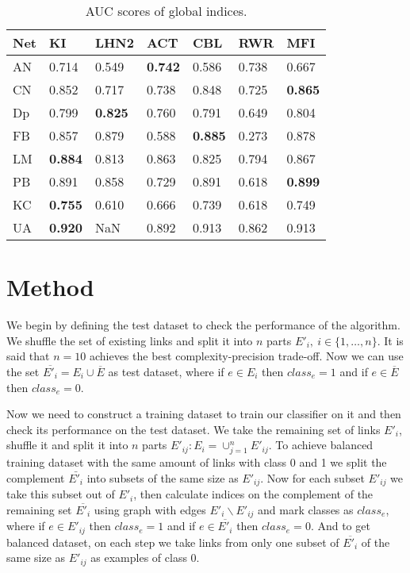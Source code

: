 \documentclass{llncs}
\begin{document}
\begin{table}
\begin{center}
\caption{AUC scores of global indices.}
\begin{tabular}{| l | l | l | l | l | l | l |}
\hline
Net & KI & LHN2 & ACT & CBL & RWR & MFI \\ \hline
AN & 0.714 & 0.549 & \textbf{0.742} & 0.586 & 0.738 & 0.667 \\ \hline
CN & 0.852 & 0.717 & 0.738 & 0.848 & 0.725 & \textbf{0.865} \\ \hline
Dp & 0.799 & \textbf{0.825} & 0.760 & 0.791 & 0.649 & 0.804 \\ \hline
FB & 0.857 & 0.879 & 0.588 & \textbf{0.885} & 0.273 & 0.878 \\ \hline
LM & \textbf{0.884} & 0.813 & 0.863 & 0.825 & 0.794 & 0.867 \\ \hline
PB & 0.891 & 0.858 & 0.729 & 0.891 & 0.618 & \textbf{0.899} \\ \hline
KC & \textbf{0.755} & 0.610 & 0.666 & 0.739 & 0.618 & 0.749 \\ \hline
UA & \textbf{0.920} & NaN & 0.892 & 0.913 & 0.862 & 0.913 \\ 
\hline
\end{tabular}
\end{center}
\end{table}
%
\section{Method}
%
We begin by defining the test dataset to check the performance of the algorithm. We shuffle the set of existing links and split it into $n$ parts $E'_i, \ i \in \{1, \ldots, n\}$. It is said that $n = 10$ achieves the best complexity-precision trade-off. Now we can use the set $\overline{E'_i} = E_i \cup \overline{E}$ as test dataset, where if $e \in E_i$ then $class_e = 1$ and if $e \in \overline{E}$ then $class_e = 0$.

Now we need to construct a training dataset to train our classifier on it and then check its performance on the test dataset. We take the remaining set of links $E'_i$, shuffle it and split it into $n$ parts $E'_{ij} : E_i = \cup_{j = 1}^{n} E'_{ij}$. To achieve balanced training dataset with the same amount of links with class 0 and 1 we split the complement $\bar{E'_i}$ into subsets of the same size as $E'_{ij}$. Now for each subset $E'_{ij}$ we take this subset out of $E'_i$, then calculate indices on the complement of the remaining set $\overline{E'_i}$ using graph with edges $E'_i \backslash E'_{ij}$ and mark classes as $class_e$, where if $e \in E'_{ij}$ then $class_e = 1$ and if $e \in \overline{E'_i}$ then $class_e = 0$. And to get balanced dataset, on each step we take links from only one subset of $\overline{E'_i}$ of the same size as $E'_{ij}$ as examples of class 0.
\end{document}
